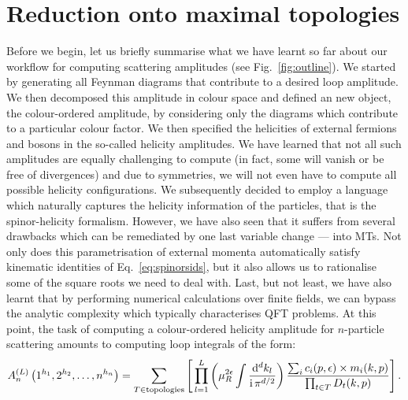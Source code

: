 \documentclass[main.tex]{subfiles}
\begin{document}
\section{Reduction onto maximal topologies} \label{sec:reduction}
Before we begin, let us briefly summarise what we have learnt so far about our workflow for computing scattering amplitudes (see Fig.~\ref{fig:outline}). We started by generating all Feynman diagrams that contribute to a desired loop amplitude. We then decomposed this amplitude in colour space and defined an new object, the colour-ordered amplitude, by considering only the diagrams which contribute to a particular colour factor. We then specified the helicities of external fermions and bosons in the so-called helicity amplitudes. We have learned that not all such amplitudes are equally challenging to compute (in fact, some will vanish or be free of divergences) and due to symmetries, we will not even have to compute all possible helicity configurations. We subsequently decided to employ a language which naturally captures the helicity information of the particles, that is the spinor-helicity formalism. However, we have also seen that it suffers from several drawbacks which can be remediated by one last variable change --- into MTs. Not only does this parametrisation of external momenta automatically satisfy kinematic identities of Eq.~\ref{eq:spinorsids}, but it also allows us to rationalise some of the square roots we need to deal with. Last, but not least, we have also learnt that by performing numerical calculations over finite fields, we can bypass the analytic complexity which typically characterises QFT problems.
At this point, the task of computing a colour-ordered helicity amplitude for $n$-particle scattering amounts to computing loop integrals of the form:
\begin{equation} \label{eq:ampschematic}
    	A_n^{(L)} \left(1^{h_1}, 2^{h_2}, \ldots, n^{h_n} \right) =  \sum_{T\in \text{topologies}} \left[\, \prod_{l=1}^{L} \left(\mu_R^{2\epsilon} \int \frac{\mathrm{d}^d k_l}{\mathrm{i} \, \pi^{d/2}}\right) \frac{\sum_i c_i(p, \epsilon )\times m_i(k,p)}{\prod_{t\in T} D_t(k,p)} \right].
\end{equation}
\end{document}
